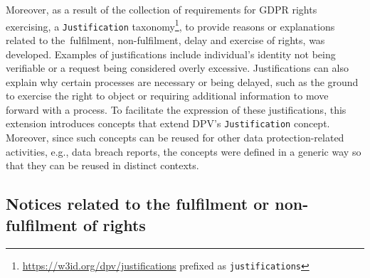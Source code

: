\documentclass{IOS-Book-Article}     %
\begin{document}



Moreover, as a result of the collection of requirements for GDPR rights exercising, a \texttt{Justification} taxonomy\footnote{\url{https://w3id.org/dpv/justifications} prefixed as \texttt{justifications}}, to provide reasons or explanations related to the~fulfilment, non-fulfilment, delay and exercise of rights, was developed.
Examples of justifications include individual's identity not being verifiable or a request being considered overly excessive.
Justifications can also explain why certain processes are necessary or being delayed, such as the ground to exercise the right to object or requiring additional information to move forward with a process.
To facilitate the expression of these justifications, this extension introduces concepts that extend DPV's \texttt{Justification} concept.
Moreover, since such concepts can be reused for other data protection-related activities, e.g., data breach reports, the concepts were defined in a generic way so that they can be reused in distinct contexts.

\subsection{Notices related to the fulfilment or non-fulfilment of rights}
\label{sec:notices}
\end{document}
